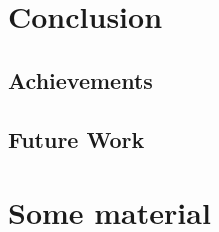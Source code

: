 \documentclass[mscthesis]{usiinfthesis}
\begin{document}
\chapter{Conclusion}
\label{ch:conc}

\section{Achievements}
\label{ch:conc_ach}

\section{Future Work}
\label{ch:conc_work}

\nocite{*}

\appendix %

\chapter{Some material}

\backmatter


%
%
%
%
%

%


\end{document}
